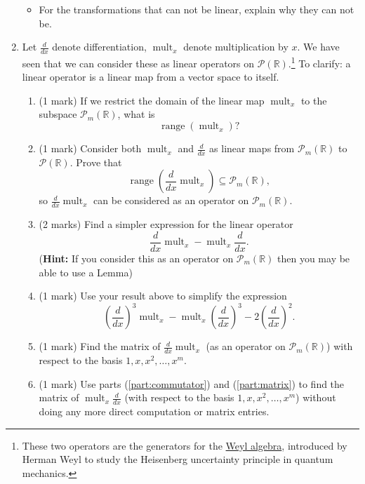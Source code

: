 \documentclass[12pt]{article}
\begin{document}
\begin{enumerate}
\begin{itemize}
  \item For the transformations that can not be linear, explain why they can not be.
  \end{itemize}
\item Let $\frac{d}{dx}$ denote differentiation, $\operatorname{mult}_{x}$ denote multiplication by $x$. We have seen that we can consider these as linear operators on $\mathcal{P}(\mathbb{R})$.\footnote{These two operators are the generators for the \href{https://en.wikipedia.org/wiki/Weyl_algebra}{Weyl algebra}, introduced by Herman Weyl to study the Heisenberg uncertainty principle in quantum mechanics.} To clarify: a linear operator is a linear map from a vector space to itself.
  \begin{enumerate}
  \item (1 mark) If we restrict the domain of the linear map $\operatorname{mult}_{x}$ to the subspace $\mathcal{P}_m(\mathbb{R})$, what is
    \[
      \operatorname{range}\left(\operatorname{mult}_{x}\right)?
    \]
  \item (1 mark) Consider both $\operatorname{mult}_{x}$ and $\frac{d}{dx}$ as linear maps from $\mathcal{P}_m(\mathbb{R})$ to $\mathcal{P}(\mathbb{R})$. Prove that    
    \[
      \operatorname{range}\left(\frac{d}{dx}\operatorname{mult}_{x}\right)\subseteq \mathcal{P}_m(\mathbb{R}),
    \]
    so $\frac{d}{dx}\operatorname{mult}_{x}$ can be considered as an operator on $\mathcal{P}_m(\mathbb{R})$.
  \item(2 marks) \label{part:commutator} Find a simpler expression for the linear operator
    \[
      \frac{d}{dx}\operatorname{mult}_{x}-\operatorname{mult}_{x}\frac{d}{dx}.
    \]
    (\textbf{Hint:} If you consider this as an operator on $\mathcal{P}_m(\mathbb{R})$ then you may be able to use a Lemma)
  \item (1 mark) Use your result above to simplify the expression
    \[
      \left(\frac{d}{dx}\right)^3\operatorname{mult}_{x} - \operatorname{mult}_{x} \left(\frac{d}{dx}\right)^3-2\left(\frac{d}{dx}\right)^2.
    \]    
   \item (1 mark) \label{part:matrix}Find the matrix of $\frac{d}{dx}\operatorname{mult}_{x}$ (as an operator on $\mathcal{P}_m(\mathbb{R})$) with respect to the basis $1,x,x^2,\ldots , x^m$.
   \item (1 mark) Use parts (\ref{part:commutator}) and (\ref{part:matrix}) to find the matrix of $\operatorname{mult}_{x}\frac{d}{dx}$ (with respect to the basis $1,x,x^2,\ldots , x^m$) without doing any more direct computation or matrix entries.

\end{enumerate}
\end{enumerate}
\end{document}
